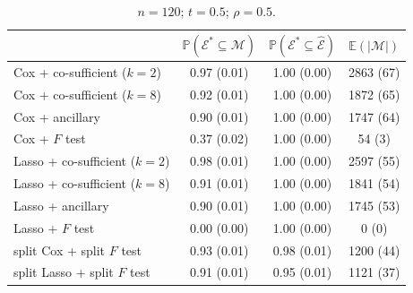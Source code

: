 \documentclass[10pt, reqno]{amsart}
\numberwithin{equation}{section}
\begin{document}
\begin{table}
	\caption{$n = 120$; $t = 0.5$; $\rho = 0.5$.}{
		\centering
		\begin{tabular}{|l|c|c|c|}
			\hline
			& $\mathbb{P}(\mathcal E^*\subseteq \mathcal{M})$
			& $\mathbb{P}(\mathcal E^*\subseteq \hat{\mathcal{E}})$
			& $\mathbb E(\vert \mathcal{M} \vert)$ \\
			\hline
			Cox + co-sufficient ($k = 2$) & 0.97 (0.01) & 1.00 (0.00) & 2863 (67) \\
			Cox + co-sufficient ($k = 8$) & 0.92 (0.01) & 1.00 (0.00) & 1872 (65) \\
			Cox + ancillary               & 0.90 (0.01) & 1.00 (0.00) & 1747 (64) \\
			Cox + $F$ test                & 0.37 (0.02) & 1.00 (0.00) & 54 (3) \\
			Lasso + co-sufficient ($k = 2$) & 0.98 (0.01) & 1.00 (0.00) & 2597 (55) \\
			Lasso + co-sufficient ($k = 8$) & 0.91 (0.01) & 1.00 (0.00) & 1841 (54) \\
			Lasso + ancillary               & 0.90 (0.01) & 1.00 (0.00) & 1745 (53) \\
			Lasso + $F$ test                & 0.00 (0.00) & 1.00 (0.00) & 0 (0) \\
			split Cox + split $F$ test      & 0.93 (0.01) & 0.98 (0.01) & 1200 (44) \\
			split Lasso + split $F$ test    & 0.91 (0.01) & 0.95 (0.01) & 1121 (37) \\
			\hline
		\end{tabular}
		\label{tab_sim_new3}
	}
\end{table}


\end{document}
